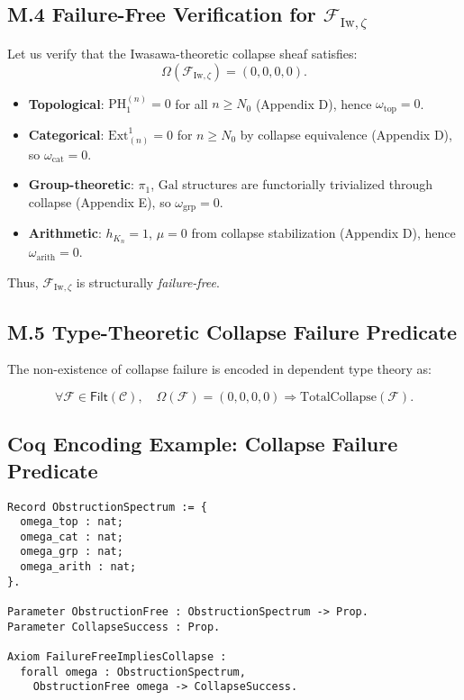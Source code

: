 \documentclass[11pt]{article}
\begin{document}
\subsection*{M.4 Failure-Free Verification for $\mathcal{F}_{\mathrm{Iw}, \zeta}$}

Let us verify that the Iwasawa-theoretic collapse sheaf satisfies:
\[
\Omega(\mathcal{F}_{\mathrm{Iw}, \zeta}) = (0, 0, 0, 0).
\]

\begin{itemize}
    \item \textbf{Topological}:  
    $\mathrm{PH}_1^{(n)} = 0$ for all $n \geq N_0$ (Appendix D), hence $\omega_{\mathrm{top}} = 0$.

    \item \textbf{Categorical}:  
    $\mathrm{Ext}^1_{(n)} = 0$ for $n \geq N_0$ by collapse equivalence (Appendix D), so $\omega_{\mathrm{cat}} = 0$.

    \item \textbf{Group-theoretic}:  
    $\pi_1$, $\mathrm{Gal}$ structures are functorially trivialized through collapse (Appendix E), so $\omega_{\mathrm{grp}} = 0$.

    \item \textbf{Arithmetic}:  
    $h_{K_n} = 1$, $\mu = 0$ from collapse stabilization (Appendix D), hence $\omega_{\mathrm{arith}} = 0$.
\end{itemize}

Thus, $\mathcal{F}_{\mathrm{Iw}, \zeta}$ is structurally \textit{failure-free}.

\subsection*{M.5 Type-Theoretic Collapse Failure Predicate}

The non-existence of collapse failure is encoded in dependent type theory as:

\[
\forall \mathcal{F} \in \mathsf{Filt}(\mathcal{C}), \quad 
\Omega(\mathcal{F}) = (0,0,0,0) \Rightarrow \mathrm{TotalCollapse}(\mathcal{F}).
\]

\subsection*{Coq Encoding Example: Collapse Failure Predicate}

\begin{lstlisting}[language=Coq, caption=Collapse Failure Exclusion Predicate, captionpos=b]
Record ObstructionSpectrum := {
  omega_top : nat;
  omega_cat : nat;
  omega_grp : nat;
  omega_arith : nat;
}.

Parameter ObstructionFree : ObstructionSpectrum -> Prop.
Parameter CollapseSuccess : Prop.

Axiom FailureFreeImpliesCollapse :
  forall omega : ObstructionSpectrum,
    ObstructionFree omega -> CollapseSuccess.
\end{lstlisting}
\end{document}
